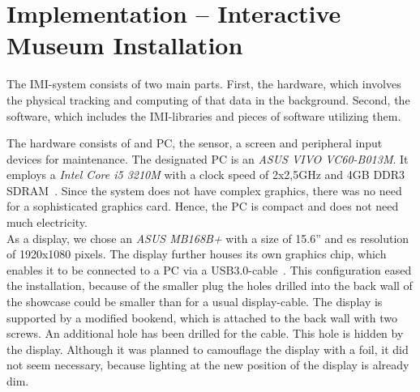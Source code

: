 \chapter{Implementation -- Interactive Museum Installation}
\label{implementation}

The \ac{IMI}-system consists of two main parts. First, the hardware, which involves the physical tracking and computing of that data in the background. Second, the software, which includes the \ac{IMI}-libraries and pieces of software utilizing them.

%


The hardware consists of and PC, the sensor, a screen and peripheral input devices for maintenance. The designated PC is an \textit{ASUS VIVO VC60-B013M}. It employs a \textit{Intel Core i5 3210M} with a clock speed of 2x2,5GHz and 4GB DDR3 SDRAM~\cite{VivoPCVC60}. Since the system does not have complex graphics, there was no need for a sophisticated graphics card. Hence, the PC is compact and does not need much electricity. 
\\
As a display, we chose an \textit{ASUS MB168B+} with a size of 15.6'' and es resolution of 1920x1080 pixels. The display further houses its own graphics chip, which enables it to be connected to a PC via a USB3.0-cable~\cite{MB168B}. This configuration eased the installation, because of the smaller plug the holes drilled into the back wall of the showcase could be smaller than for a usual display-cable. The display is supported by a modified bookend, which is attached to the back wall with two screws. An additional hole has been drilled for the cable. This hole is hidden by the display. Although it was planned to camouflage the display with a foil, it did not seem necessary, because lighting at the new position of the display is already dim.

